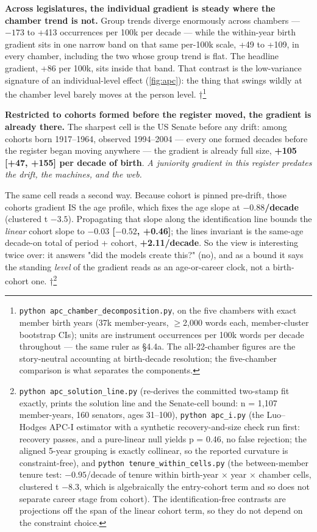 \textbf{Across legislatures, the individual gradient is steady where the chamber trend is not.} Group trends diverge enormously across chambers --- \(-173\) to +413 occurrences per 100k per decade --- while the within-year birth gradient sits in one narrow band on that same per-100k scale, +49 to +109, in every chamber, including the two whose group trend is flat. The headline gradient, +86 per 100k, sits inside that band. That contrast is the low-variance signature of an individual-level effect (\cref{fig:apc}): the thing that swings wildly at the chamber level barely moves at the person level. †\footnote{\texttt{python\ apc\_\allowbreak{}chamber\_\allowbreak{}decomposition.\allowbreak{}py}, on the five chambers with exact member birth years (37k member-years, \(\geq\)2,000 words each, member-cluster bootstrap CIs); units are instrument occurrences per 100k words per decade throughout --- the same ruler as §4.4a. The all-22-chamber figures are the story-neutral accounting at birth-decade resolution; the five-chamber comparison is what separates the components.}

\textbf{Restricted to cohorts formed before the register moved, the gradient is already there.} The sharpest cell is the US Senate before any drift: among cohorts born 1917--1964, observed 1994--2004 --- every one formed decades before the register began moving anywhere --- the gradient is already full size, \textbf{+105 {[}+47, +155{]} per decade of birth}. \emph{A juniority gradient in this register predates the drift, the machines, and the web.}

The same cell reads a second way. Because cohort is pinned pre-drift, those cohorts\textquotesingle{} gradient IS the age profile, which fixes the age slope at \textbf{\(-0.88\)/decade} (clustered t \(-3.5\)). Propagating that slope along the identification line bounds the \emph{linear} cohort slope to \textbf{\(-0.03\) {[}\(-0.52\), +0.46{]}}; the line\textquotesingle s invariant is the same-age decade-on total of period + cohort, \textbf{+2.11/decade}. So the view is interesting twice over: it answers "did the models create this?" (no), and as a bound it says the standing \emph{level} of the gradient reads as an age-or-career clock, not a birth-cohort one. †\footnote{\texttt{python\ apc\_\allowbreak{}solution\_\allowbreak{}line.\allowbreak{}py} (re-derives the committed two-stamp fit exactly, prints the solution line and the Senate-cell bound: n = 1,107 member-years, 160 senators, ages 31--100), \texttt{python\ apc\_i.py} (the Luo--Hodges APC-I estimator with a synthetic recovery-and-size check run first: recovery passes, and a pure-linear null yields p = 0.46, no false rejection; the aligned 5-year grouping is exactly collinear, so the reported curvature is constraint-free), and \texttt{python\ tenure\_\allowbreak{}within\_\allowbreak{}cells.\allowbreak{}py} (the between-member tenure test: \(-0.95\)/decade of tenure within birth-year \(\times\) year \(\times\) chamber cells, clustered t \(-8.3\), which is algebraically the entry-cohort term and so does not separate career stage from cohort). The identification-free contrasts are projections off the span of the linear cohort term, so they do not depend on the constraint choice.}

